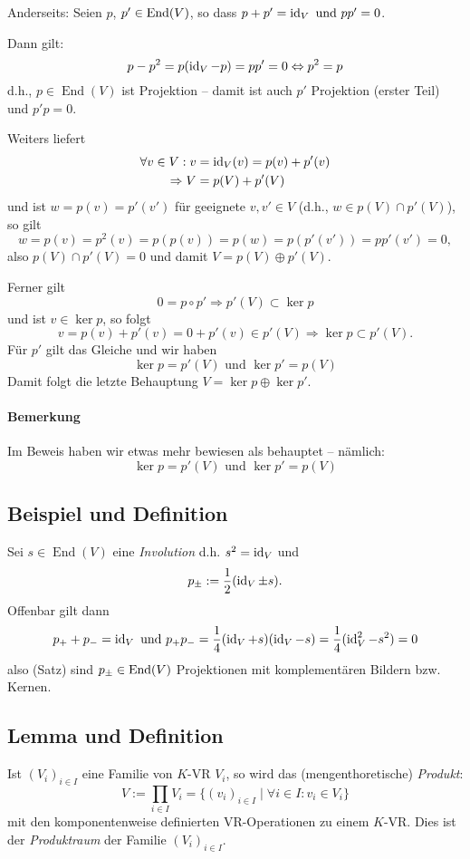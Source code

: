  		Anderseits: Seien $p$, $p'\in \operatorname{End}(V)$, so dass $p+p' = \operatorname{id}_V \text{ und } pp' = 0$.

 		Dann gilt:
 		\[
 			p-p^2 = p(\operatorname{id}_V-p) = pp' = 0 \Leftrightarrow p^2=p
 		\]
 		d.h., $p\in\operatorname{End}(V)$ ist Projektion -- damit ist auch $p'$ Projektion (erster Teil) und $p' p = 0 $.

 		Weiters liefert
 		\begin{align*}
 			\forall v\in V: v & =\operatorname{id}_V(v) = p(v) + p'(v) \\
 			\Rightarrow V     & = p(V)+p'(V)
 		\end{align*}
 		und ist $w = p(v)= p'(v')$ für geeignete $v,v'\in V$ (d.h., $w \in p(V)\cap p'(V)$), so gilt
 		\[
 			w = p(v) = p^2(v) = p(p(v)) = p(w) = p(p'(v')) = pp'(v') = 0,
 		\]
 		also $p(V)\cap p'(V) = {0}$ und damit $V = p(V)\oplus p'(V)$.

 		Ferner gilt
 		\[
 			0 = p \circ p' \Rightarrow p'(V)\subset \ker p
 		\]
 		und ist $v\in \ker p$, so folgt
 		\[
 			v = p(v) + p'(v) = 0 + p'(v)\in p'(V) \Rightarrow \ker p \subset p'(V).
 		\]
 		Für $p'$ gilt das Gleiche und wir haben
 		\[
 			\ker p = p'(V) \text{ und } \ker p' = p(V)
 		\]
 		Damit folgt die letzte Behauptung $V = \ker p \oplus\ker p'$.

 	\paragraph{Bemerkung}
 		Im Beweis haben wir etwas mehr bewiesen als behauptet -- nämlich:
 		\[
 			\ker p = p'(V)\text{ und }\ker p' = p(V)
 		\]

 \subsection{Beispiel und Definition}
 	\begin{Definition}[]
 		Sei $s\in \operatorname{End}(V)$ eine \emph{Involution} d.h. $s^2 = \operatorname{id}_V$  und
 		\[
 			p_\pm := \frac{1}{2}(\operatorname{id}_V\pm s).
 		\]
 		Offenbar gilt dann
 		\[
 			p_{+} + p_{-} = \operatorname{id}_V \text{ und } p_+ p_{-} = \frac{1}{4}(\operatorname{id}_V +s)(\operatorname{id}_V -s) =  \frac{1}{4}(\operatorname{id}_V^2-s^2)=0
 		\]
 		also (Satz) sind $p_\pm\in\operatorname{End}(V)$ Projektionen mit komplementären Bildern bzw. Kernen.
 	\end{Definition}

 \subsection{Lemma und Definition}
 	\begin{Definition}
 		Ist $(V_i)_{i\in I}$ eine Familie von $ K $-VR $V_i$, so wird das (mengenthoretische) \emph{Produkt}:
 		\[
 			V:= \prod_{i\in I}V_i=\{(v_i)_{i\in I}\mid\forall i\in I:v_i\in V_i\}
 		\]
 		mit den komponentenweise definierten VR-Operationen zu einem $ K $-VR. Dies ist der \emph{Produktraum} der Familie	$(V_i)_{i\in I}$.
 	\end{Definition}

